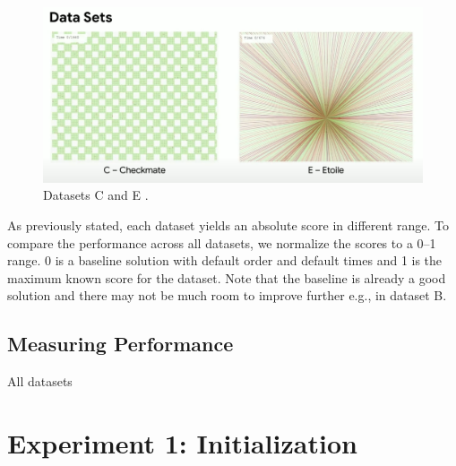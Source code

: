 \begin{figure}
    \centering
    \includegraphics[width=\linewidth]{img/screenshots/hashcode_datasets_c_e.png}
    \caption[Datasets C and E]{
        Datasets C and E \cite{google2023google}.
    }
    \label{fig:hashcode_dataset_c_e}
\end{figure}

\bigskip

As previously stated, each dataset yields an absolute score in different range. To compare the performance across all datasets, we normalize the scores to a 0--1 range. 0 is a baseline solution with default order and default times and 1 is the maximum known score for the dataset. Note that the baseline is already a good solution and there may not be much room to improve further e.g., in dataset B.

\subsection{Measuring Performance}

All datasets 

\section{Experiment 1: Initialization}

